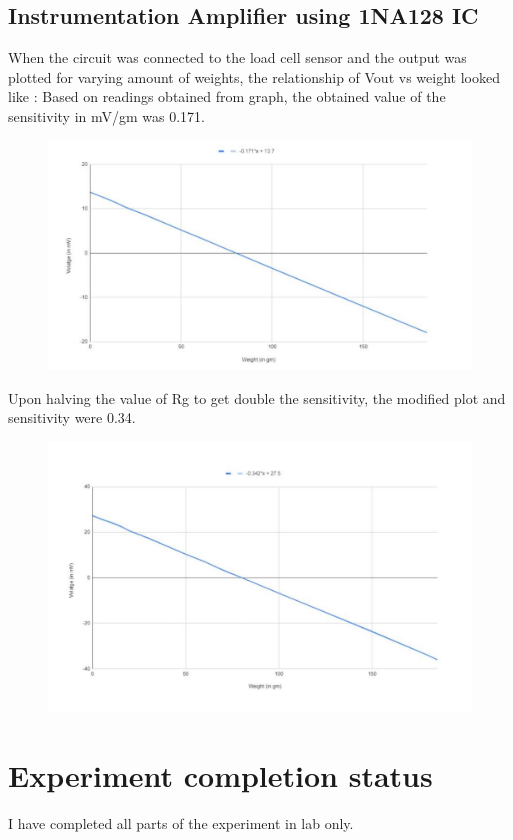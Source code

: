 \documentclass[12pt]{article}
\begin{document}
\subsection{Instrumentation Amplifier using 1NA128 IC}
When the circuit was connected to the load cell sensor and the output was
plotted for varying amount of weights, the relationship of Vout vs weight
looked like :
Based on readings obtained from graph, the obtained value of the sensitivity
in mV/gm was 0.171.
\begin{figure}
\centering
\includegraphics[scale = 0.4]{graph2.png}
\end{figure}
\newpage
Upon halving the value of Rg to get double the sensitivity, the modified plot
and sensitivity were 0.34.
\begin{figure}
\centering
\includegraphics[scale = 0.4]{graph3.png}
\end{figure}
\newpage
\section{Experiment completion status}
I have completed all parts of the experiment in lab only.
\end{document}
